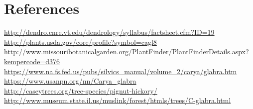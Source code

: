 \documentclass{article}\usepackage[]{graphicx}\usepackage[]{color}
\begin{document}
\section*{References}
\url{http://dendro.cnre.vt.edu/dendrology/syllabus/factsheet.cfm?ID=19} \\
\url{http://plants.usda.gov/core/profile?symbol=cagl8} \\
\url{http://www.missouribotanicalgarden.org/PlantFinder/PlantFinderDetails.aspx?kempercode=d376} \\
\url{https://www.na.fs.fed.us/pubs/silvics_manual/volume_2/carya/glabra.htm} \\
\url{https://www.usanpn.org/nn/Carya_glabra}\\
\url{http://caseytrees.org/tree-species/pignut-hickory/}\\
\url{http://www.museum.state.il.us/muslink/forest/htmls/trees/C-glabra.html}
\end{document}
